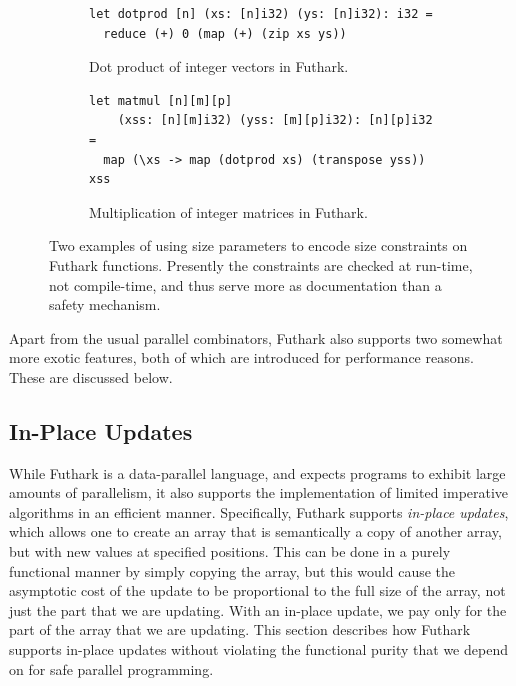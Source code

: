 \begin{figure}
  \centering
  \begin{subfigure}{1\textwidth}
    \begin{lstlisting}[xleftmargin=0pt]
let dotprod [n] (xs: [n]i32) (ys: [n]i32): i32 =
  reduce (+) 0 (map (+) (zip xs ys))
\end{lstlisting}
    \caption{Dot product of integer vectors in Futhark.}
    \label{fig:futhark-dotprod}
  \end{subfigure}
\par\bigskip
  \begin{subfigure}{1\textwidth}
\begin{lstlisting}[xleftmargin=0pt]
let matmul [n][m][p]
    (xss: [n][m]i32) (yss: [m][p]i32): [n][p]i32 =
  map (\xs -> map (dotprod xs) (transpose yss)) xss
\end{lstlisting}
    \caption{Multiplication of integer matrices in Futhark.}
    \label{fig:futhark-matmult}
  \end{subfigure}

  \caption{Two examples of using size parameters to encode size constraints on Futhark functions.  Presently the constraints are checked at run-time, not compile-time, and thus serve more as documentation than a safety mechanism.}
  \label{fig:futhark-size-parameters}
\end{figure}

Apart from the usual parallel combinators, Futhark also supports two
somewhat more exotic features, both of which are introduced for
performance reasons.  These are discussed below.

\subsection{In-Place Updates}
\label{sec:uniqueness-types}

While Futhark is a data-parallel language, and expects programs to
exhibit large amounts of parallelism, it also supports the
implementation of limited imperative algorithms in an efficient
manner.  Specifically, Futhark supports \textit{in-place updates},
which allows one to create an array that is semantically a copy of
another array, but with new values at specified positions.  This can
be done in a purely functional manner by simply copying the array, but
this would cause the asymptotic cost of the update to be proportional
to the full size of the array, not just the part that we are updating.
With an in-place update, we pay only for the part of the array that we
are updating.  This section describes how Futhark supports in-place
updates without violating the functional purity that we depend on for
safe parallel programming.


